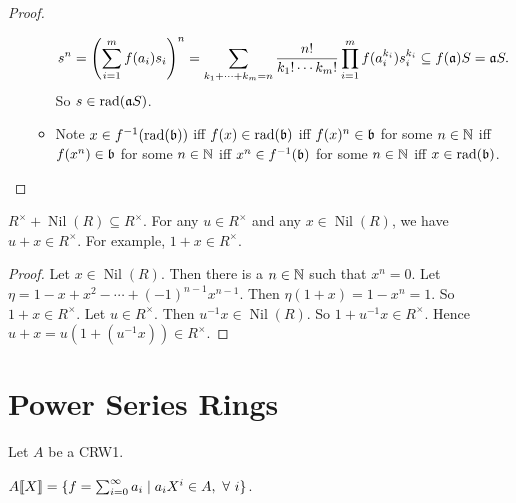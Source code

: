 \begin{proof}
\begin{enumerate}[(a)]
\begin{itemize}
                    \[s^n = \left(\sum_{i=1}^m f(a_i)s_i\right)^n = \sum_{k_1 + \cdots + k_m = n} \frac{n!}{k_1! \cdots k_m!} \prod_{i=1}^m f(a_i^{k_i})s_i^{k_i} \subseteq f(\mathfrak{a})S = \mathfrak{a} S.\]
                    So $s \in \operatorname{rad}(\mathfrak{a} S)$.
                \item
                    Note $x \in f^{-1}(\operatorname{rad}(\mathfrak{b}))$ iff $f(x) \in \operatorname{rad}(\mathfrak{b})$ iff $f(x)^n \in \mathfrak{b}$ for some $n \in \mathbb{N}$ iff $f(x^n) \in \mathfrak{b}$ for some $n \in \mathbb{N}$ iff $x^n  \in f^{-1}(\mathfrak{b})$ for some $n \in \mathbb{N}$ iff $x \in \operatorname{rad}(\mathfrak{b})$.
            \end{itemize}
    \end{enumerate}
\end{proof}

\begin{proposition}
    $R^\times + \operatorname{Nil}(R) \subseteq R^\times$. For any $u \in R^\times$ and any $x \in \operatorname{Nil}(R)$, we have $u+x \in R^\times$. For example, $1+x \in R^\times$.
\end{proposition}

\begin{proof}
    Let $x \in \operatorname{Nil}(R)$. Then there is a $n \in \mathbb{N}$ such that $x^n = 0$. Let $\eta = 1-x+x^2-\cdots+(-1)^{n-1}x^{n-1}$. Then $\eta(1+x) = 1-x^n = 1$. So $1+x \in R^\times$. Let $u \in R^\times$. Then $u^{-1}x \in \operatorname{Nil}(R)$. So $1+u^{-1}x \in R^\times$. Hence $u + x = u(1+(u^{-1}x)) \in R^\times$. 
\end{proof}

\section{Power Series Rings}

Let $A$ be a CRW1.

\begin{definition}
    $A \llbracket X \rrbracket = \{f = \sum_{i=0}^\infty a_i \mid a_iX^i \in A,\ \forall \  i\}$.
\end{definition}

\begin{example}

\end{example}

\begin{theorem}

\end{theorem}

